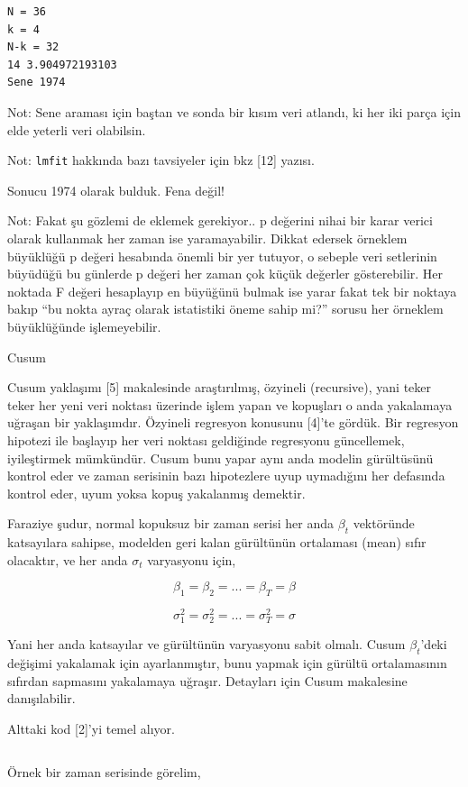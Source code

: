 \documentclass[12pt,fleqn]{article}\usepackage{../../common}
\begin{document}
\begin{verbatim}
N = 36
k = 4
N-k = 32
14 3.904972193103
Sene 1974
\end{verbatim}

Not: Sene araması için baştan ve sonda bir kısım veri atlandı, ki her iki
parça için elde yeterli veri olabilsin. 

Not: \verb!lmfit! hakkında bazı tavsiyeler için bkz [12] yazısı.

Sonucu 1974 olarak bulduk. Fena değil!

Not: Fakat şu gözlemi de eklemek gerekiyor.. p değerini nihai bir karar verici
olarak kullanmak her zaman ise yaramayabilir. Dikkat edersek örneklem büyüklüğü
p değeri hesabında önemli bir yer tutuyor, o sebeple veri setlerinin büyüdüğü bu
günlerde p değeri her zaman çok küçük değerler gösterebilir. Her noktada F
değeri hesaplayıp en büyüğünü bulmak ise yarar fakat tek bir noktaya bakıp
``bu nokta ayraç olarak istatistiki öneme sahip mi?'' sorusu her örneklem
büyüklüğünde işlemeyebilir. 

Cusum

Cusum yaklaşımı [5] makalesinde araştırılmış, özyineli (recursive), yani teker
teker her yeni veri noktası üzerinde işlem yapan ve kopuşları o anda yakalamaya
uğraşan bir yaklaşımdır. Özyineli regresyon konusunu [4]'te gördük. Bir
regresyon hipotezi ile başlayıp her veri noktası geldiğinde regresyonu
güncellemek, iyileştirmek mümkündür. Cusum bunu yapar aynı anda modelin
gürültüsünü kontrol eder ve zaman serisinin bazı hipotezlere uyup uymadığını her
defasında kontrol eder, uyum yoksa kopuş yakalanmış demektir.

Faraziye şudur, normal kopuksuz bir zaman serisi her anda $\beta_t$ vektöründe
katsayılara sahipse, modelden geri kalan gürültünün ortalaması (mean) sıfır
olacaktır, ve her anda $\sigma_t$ varyasyonu için,

$$
\beta_1 = \beta_2 = ... = \beta_T = \beta
$$

$$
\sigma_1^2 = \sigma_2^2 = ... = \sigma_T^2 = \sigma
$$

Yani her anda katsayılar ve gürültünün varyasyonu sabit olmalı. Cusum
$\beta_t$'deki değişimi yakalamak için ayarlanmıştır, bunu yapmak için gürültü
ortalamasının sıfırdan sapmasını yakalamaya uğraşır. Detayları için Cusum
makalesine danışılabilir.

Alttaki kod [2]'yi temel alıyor. 

\inputminted[fontsize=\footnotesize]{python}{cusum.py}

Örnek bir zaman serisinde görelim,
\end{document}
